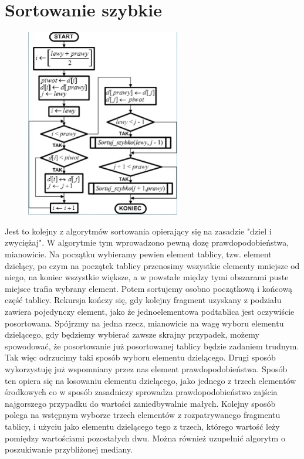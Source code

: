 \documentclass[a4paper,11pt]{article}
\begin{document}
\section{Sortowanie szybkie}
\begin{figure}
\begin{center}
\vspace{-20pt}
\includegraphics[width=0.6\textwidth]{rys11}
\end{center}
\vspace{-20pt}
\vspace{-10pt}
\end{figure}
Jest to kolejny z algorytmów sortowania opierający się na 
zasadzie "dziel i zwyciężaj". W algorytmie tym 
wprowadzono pewną dozę prawdopodobieństwa, 
mianowicie. Na początku wybieramy pewien element 
tablicy, tzw. element dzielący, po czym na początek tablicy 
przenosimy wszystkie elementy mniejsze od niego, na 
koniec wszystkie większe, a w powstałe między tymi 
obszarami puste miejsce trafia wybrany element. Potem 
sortujemy osobno początkową i końcową część tablicy. 
Rekursja kończy się, gdy kolejny fragment uzyskany z 
podziału zawiera pojedynczy element, jako że 
jednoelementowa podtablica jest oczywiście posortowana. 
Spójrzmy na jedna rzecz, mianowicie na wagę wyboru 
elementu dzielącego, gdy będziemy wybierać zawsze skrajny 
przypadek, możemy spowodować, że posortowanie już 
posortowanej tablicy będzie zadaniem trudnym. 
Tak więc odrzucimy taki sposób wyboru elementu dzielącego. 
Drugi sposób wykorzystuję już wspomniany przez nas element prawdopodobieństwa. Sposób ten 
opiera się na losowaniu elementu dzielącego, jako jednego z trzech elementów środkowych co w 
sposób zasadniczy sprowadza prawdopodobieństwo zajścia najgorszego przypadku do wartości 
zaniedbywalnie małych. 
Kolejny sposób polega na wstępnym wyborze trzech elementów z rozpatrywanego fragmentu 
tablicy, i użyciu jako elementu dzielącego tego z trzech, którego wartość leży pomiędzy 
wartościami pozostałych dwu. Można również uzupełnić algorytm o poszukiwanie przybliżonej 
mediany.
\newpage
\end{document}
